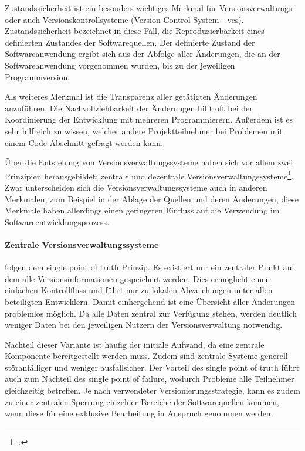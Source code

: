 Zustandssicherheit ist ein besonders wichtiges Merkmal für Versionsverwaltungs- oder auch Versionskontrollsysteme (Version-Control-System - \acs{vcs}).
Zustandssicherheit bezeichnet in diese Fall, die Reproduzierbarkeit eines definierten Zustandes der Softwarequellen. Der definierte Zustand der Softwareanwendung ergibt sich
aus der Abfolge aller Änderungen, die an der Softwareanwendung vorgenommen wurden, bis zu der jeweiligen Programmversion. 

Als weiteres Merkmal ist die Transparenz aller getätigten Änderungen anzuführen. Die Nachvollziehbarkeit der Änderungen 
hilft oft bei der Koordinierung der Entwicklung mit mehreren Programmierern. Außerdem ist es sehr hilfreich zu wissen, 
welcher andere Projektteilnehmer bei Problemen mit einem Code-Abschnitt gefragt werden kann. 

Über die Entstehung von Versionsverwaltungssysteme haben sich vor allem zwei Prinzipien herausgebildet: zentrale und dezentrale Versionsverwaltungssysteme\footcite[vgl.][S.417]{software-quality2008}. Zwar unterscheiden sich die Versionsverwaltungssysteme auch in 
anderen Merkmalen, zum Beispiel in der Ablage der Quellen und deren Änderungen, diese Merkmale haben allerdings einen geringeren Einfluss auf die Verwendung im Softwareentwicklungsprozess.

\paragraph{Zentrale Versionsverwaltungssysteme} folgen dem \glqq single point of truth\grqq{} Prinzip. Es existiert nur ein
zentraler Punkt auf dem alle Versionsinformationen gespeichert werden. Dies ermöglicht einen einfachen Kontrollfluss und führt nur zu lokalen Abweichungen unter allen beteiligten Entwicklern. Damit einhergehend ist eine Übersicht aller Änderungen problemlos möglich. 
Da alle Daten zentral zur Verfügung stehen, werden deutlich weniger Daten bei den jeweiligen Nutzern der Versionsverwaltung notwendig.

Nachteil dieser Variante ist häufig der initiale Aufwand, da eine zentrale Komponente bereitgestellt werden muss. Zudem 
sind zentrale Systeme generell störanfälliger und weniger ausfallsicher. Der Vorteil des \glqq single point of truth\grqq{} führt
auch zum Nachteil des \glqq single point of failure\grqq{}, wodurch Probleme alle Teilnehmer gleichzeitig betreffen.
Je nach verwendeter Versionierungsstrategie, kann es zudem zu einer zentralen Sperrung einzelner Bereiche der Softwarequellen kommen, wenn diese für eine exklusive Bearbeitung in Anspruch genommen werden.

